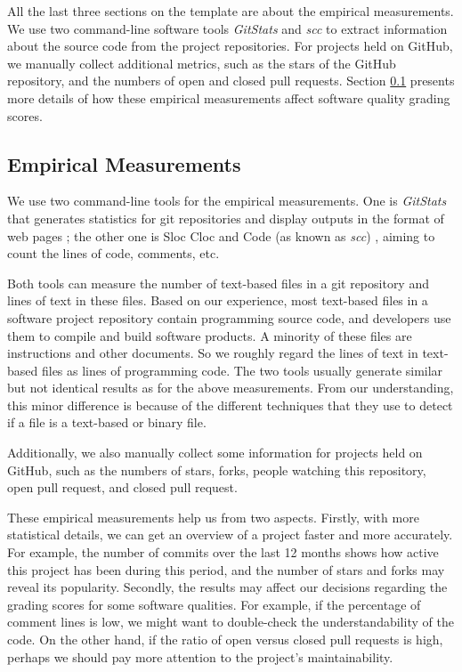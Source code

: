 All the last three sections on the template are about the empirical measurements. We use two command-line software tools \textit{GitStats} and \textit{scc} to extract information about the source code from the project repositories. For projects held on GitHub, we manually collect additional metrics, such as the stars of the GitHub repository, and the numbers of open and closed pull requests. Section \ref{sec_empirical_measurements} presents more details of how these empirical measurements affect software quality grading scores.

\subsection{Empirical Measurements}
\label{sec_empirical_measurements}

We use two command-line tools for the empirical measurements. One is \textit{GitStats} that generates statistics for git repositories and display outputs in the format of web pages \cite{Gieniusz2019}; the other one is Sloc Cloc and Code (as known as \textit{scc}) \cite{Boyter2021}, aiming to count the lines of code, comments, etc.

Both tools can measure the number of text-based files in a git repository and lines of text in these files. Based on our experience, most text-based files in a software project repository contain programming source code, and developers use them to compile and build software products. A minority of these files are instructions and other documents. So we roughly regard the lines of text in text-based files as lines of programming code. The two tools usually generate similar but not identical results as for the above measurements. From our understanding, this minor difference is because of the different techniques that they use to detect if a file is a text-based or binary file.

Additionally, we also manually collect some information for projects held on GitHub, such as the numbers of stars, forks, people watching this repository, open pull request, and closed pull request.

These empirical measurements help us from two aspects. Firstly, with more statistical details, we can get an overview of a project faster and more accurately. For example, the number of commits over the last 12 months shows how active this project has been during this period, and the number of stars and forks may reveal its popularity. Secondly, the results may affect our decisions regarding the grading scores for some software qualities. For example, if the percentage of comment lines is low, we might want to double-check the understandability of the code. On the other hand, if the ratio of open versus closed pull requests is high, perhaps we should pay more attention to the project’s maintainability.

